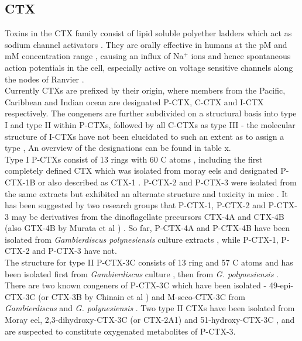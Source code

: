\documentclass[12pt]{article}
\begin{document}
\subsection{CTX}
Toxins in the CTX family consist of lipid soluble polyether ladders which act as sodium channel activators \citep{dechraoui1999ciguatoxins}. They are orally effective in humans at the pM and mM concentration range \citep{molgo2000ciguatera}, causing an influx of Na$^{+}$ ions and hence spontaneous action potentials in the cell, especially active on voltage sensitive channels along the nodes of Ranvier \citep{sims1987theoretical,mattei1999neurotoxins,lewis1992action,molgo2000ciguatera}. \\	   
Currently CTXs are prefixed by their origin, where members from the Pacific, Caribbean and Indian ocean are designated P-CTX, C-CTX and I-CTX respectively. %
The congeners are further subdivided on a structural basis into type I and type II within P-CTXs, followed by all C-CTXs as type III - the molecular structure of I-CTXs have not been elucidated to such an extent as to assign a type \citep{legrand1997two,hamilton2002multiple,hamilton2002isolation}, An overview of the designations can be found in table x.  \\
Type I P-CTXs consist of 13 rings with 60 C atoms \citep{murata1990structures,lewis1991purification,lewis1993origin}, including the first completely defined CTX which was isolated from moray eels and designated P-CTX-1B \citep{murata1990structures} or also described as CTX-1 \citep{lewis1991purification}. P-CTX-2 and P-CTX-3 were isolated from the same extracts but exhibited an alternate structure and toxicity in mice \citep{lewis1991purification}. It has been suggested by two research groups that P-CTX-1, P-CTX-2 and P-CTX-3 may be derivatives from the dinoflagellate precursors CTX-4A and CTX-4B (also GTX-4B by Murata et al \citep{murata1990structures}) \citep{lewis1993origin,yasumoto2000structural}. So far, P-CTX-4A and P-CTX-4B have been isolated from \emph{Gambierdiscus polynesiensis} culture extracts \citep{chinain2010growth}, while P-CTX-1, P-CTX-2 and P-CTX-3 have not. \\
The structure for type II P-CTX-3C consists of 13 ring and 57 C atoms and has been isolated first from \emph{Gambierdiscus} culture \citep{satake1993structure}, then from \emph{G. polynesiensis} \citep{chinain2010growth}. There are two known congeners of P-CTX-3C which have been isolated - 49-epi-CTX-3C (or CTX-3B by Chinain et al \citep{chinain2010growth}) and M-seco-CTX-3C from \emph{Gambierdiscus} \citep{satake1993structure} and \emph{G. polynesiensis} \citep{chinain2010growth}. Two type II CTXs have been isolated from Moray eel, 2,3-dihydroxy-CTX-3C (or CTX-2A1) and 51-hydroxy-CTX-3C \cite{satake1998isolation}, and are suspected to constitute oxygenated metabolites of P-CTX-3. \\ %
\end{document}
